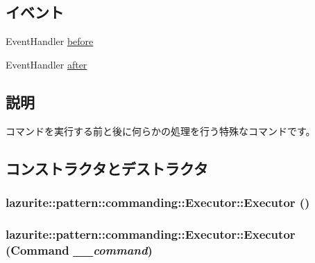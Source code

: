 \subsection*{イベント}
\begin{DoxyCompactItemize}
\item 
EventHandler \hyperlink{classlazurite_1_1pattern_1_1commanding_1_1_executor_aa8048561064752835707060029dd6e24}{before}
\item 
EventHandler \hyperlink{classlazurite_1_1pattern_1_1commanding_1_1_executor_a193c80a09aa815985d1140da15798aa6}{after}
\end{DoxyCompactItemize}


\subsection{説明}
コマンドを実行する前と後に何らかの処理を行う特殊なコマンドです。 

\subsection{コンストラクタとデストラクタ}
\hypertarget{classlazurite_1_1pattern_1_1commanding_1_1_executor_a996d859c4ffe9f8651a4cc6d52250ba5}{
\subsubsection[{Executor}]{\setlength{\rightskip}{0pt plus 5cm}lazurite::pattern::commanding::Executor::Executor ()}}
\label{classlazurite_1_1pattern_1_1commanding_1_1_executor_a996d859c4ffe9f8651a4cc6d52250ba5}
\hypertarget{classlazurite_1_1pattern_1_1commanding_1_1_executor_affdea22125a7642892b8b6a47abf6935}{
\subsubsection[{Executor}]{\setlength{\rightskip}{0pt plus 5cm}lazurite::pattern::commanding::Executor::Executor ({\bf Command} {\em \_\-\_\-command})}}
\label{classlazurite_1_1pattern_1_1commanding_1_1_executor_affdea22125a7642892b8b6a47abf6935}

